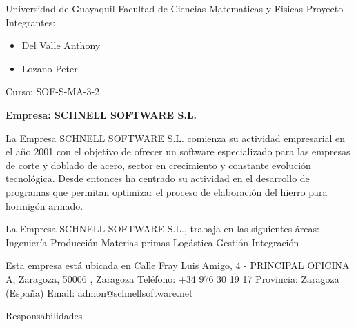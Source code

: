 \begin{center}
Universidad de Guayaquil
Facultad de Ciencias Matematicas y Fisicas
Proyecto
Integrantes:
\begin{itemize}
	\item Del Valle Anthony
	\item Lozano Peter
\end{itemize}
Curso: SOF-S-MA-3-2
\end{center}

\textbf{Empresa: SCHNELL SOFTWARE S.L.}

La Empresa SCHNELL SOFTWARE S.L. comienza su actividad empresarial en el año 2001 con el objetivo de ofrecer un software especializado para las empresas de corte y doblado de acero, sector en crecimiento y constante evolución tecnológica. Desde entonces ha centrado su actividad en el desarrollo de programas que permitan optimizar el proceso de elaboración del hierro para hormigón armado.

La Empresa SCHNELL SOFTWARE S.L., trabaja en las siguientes áreas:
Ingeniería
Producción
Materias primas
Logástica
Gestión
Integración

Esta empresa está ubicada en Calle Fray Luis Amigo, 4 - PRINCIPAL OFICINA A, Zaragoza, 50006 , Zaragoza
Teléfono: +34 976 30 19 17
Provincia: Zaragoza (España)
Email: admon@schnellsoftware.net

Responsabilidades
